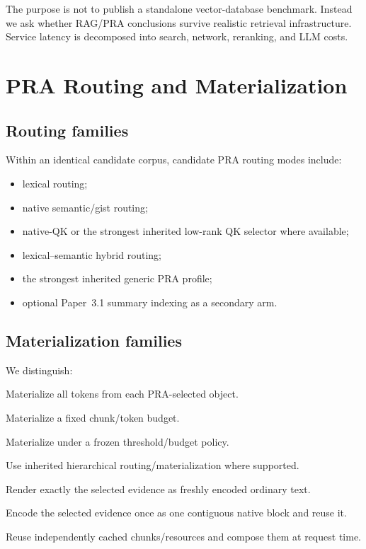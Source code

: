 \documentclass[11pt]{article}
\begin{document}
The purpose is not to publish a standalone vector-database benchmark.  Instead we ask whether RAG/PRA conclusions survive realistic retrieval infrastructure.  Service latency is decomposed into search, network, reranking, and LLM costs.

\section{PRA Routing and Materialization}

\subsection{Routing families}
Within an identical candidate corpus, candidate PRA routing modes include:
\begin{itemize}[leftmargin=*]
    \item lexical routing;
    \item native semantic/gist routing;
    \item native-QK or the strongest inherited low-rank QK selector where available;
    \item lexical--semantic hybrid routing;
    \item the strongest inherited generic PRA profile;
    \item optional Paper~3.1 summary indexing as a secondary arm.
\end{itemize}

\subsection{Materialization families}
We distinguish:
\begin{description}[leftmargin=2.5cm]
    \item[Full.] Materialize all tokens from each PRA-selected object.
    \item[Fixed partial.] Materialize a fixed chunk/token budget.
    \item[Score partial.] Materialize under a frozen threshold/budget policy.
    \item[Hierarchical.] Use inherited hierarchical routing/materialization where supported.
    \item[Selected Context.] Render exactly the selected evidence as freshly encoded ordinary text.
    \item[Native contiguous.] Encode the selected evidence once as one contiguous native block and reuse it.
    \item[Native independent.] Reuse independently cached chunks/resources and compose them at request time.
\end{description}
\end{document}
